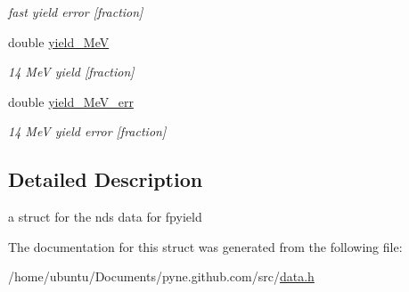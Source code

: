 \begin{DoxyCompactItemize}
\begin{DoxyCompactList}\small\item\em fast yield error \mbox{[}fraction\mbox{]} \end{DoxyCompactList}\item 
double \hyperlink{structpyne_1_1ndsfpysub_afb3737be03fedddc6f54fa3a0e59f0e8}{yield\+\_\+MeV}\hypertarget{structpyne_1_1ndsfpysub_afb3737be03fedddc6f54fa3a0e59f0e8}{}\label{structpyne_1_1ndsfpysub_afb3737be03fedddc6f54fa3a0e59f0e8}

\begin{DoxyCompactList}\small\item\em 14 MeV yield \mbox{[}fraction\mbox{]} \end{DoxyCompactList}\item 
double \hyperlink{structpyne_1_1ndsfpysub_a7bc2487245689a3f6a095f2254e66e99}{yield\+\_\+Me\+V\+\_\+err}\hypertarget{structpyne_1_1ndsfpysub_a7bc2487245689a3f6a095f2254e66e99}{}\label{structpyne_1_1ndsfpysub_a7bc2487245689a3f6a095f2254e66e99}

\begin{DoxyCompactList}\small\item\em 14 MeV yield error \mbox{[}fraction\mbox{]} \end{DoxyCompactList}\end{DoxyCompactItemize}


\subsection{Detailed Description}
a struct for the nds data for fpyield 

The documentation for this struct was generated from the following file\+:\begin{DoxyCompactItemize}
\item 
/home/ubuntu/\+Documents/pyne.\+github.\+com/src/\hyperlink{data_8h}{data.\+h}\end{DoxyCompactItemize}
